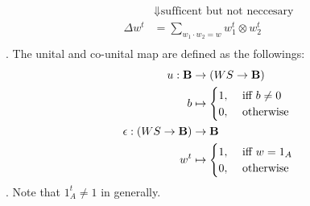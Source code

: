 \begin{example}
\begin{equation}
\begin{split}
	&\Downarrow \text{sufficent but not neccesary} \\
	\Delta w^t &= \sum_{w_1 \cdot w_2=w} w_1^t \otimes w_2^t \\
\end{split}\end{equation}
. The unital and co-unital map are defined as the followings:
\begin{equation}\begin{split}
	u: {\mathbf{B}} &\to (WS \to {\mathbf{B}}) \\
		b &\mapsto \begin{cases}
			1, &\text{ iff } b \neq 0 \\
			0, &\text{ otherwise } \\
		\end{cases} \\
	\epsilon: (WS \to {\mathbf{B}}) &\to {\mathbf{B}} \\
		w^t &\mapsto \begin{cases}
			1, &\text{ iff } w = 1_A \\
			0, &\text{ otherwise } \\
		\end{cases}
\end{split}\end{equation}
. Note that $1_A^t \neq 1$ in generally.


\end{example}
